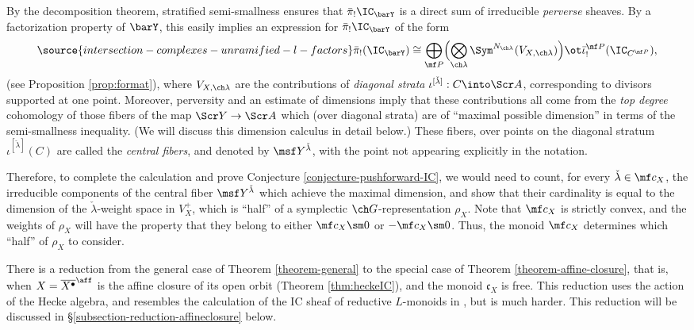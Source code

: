 By the decomposition theorem, stratified semi-smallness ensures that $\bar\pi_! \IC_{\barY}$ is a direct sum of irreducible \emph{perverse} sheaves. By a factorization property of $\barY$, this easily implies an expression for $\bar\pi_! \IC_{\barY}$ of the form
\begin{equation} \label{e:format1-intro}
\source{intersection-complexes-unramified-l-factors}
 \bar\pi_!(\IC_{\barY}) \cong
\bigoplus_{\mf P}
\Bigl( \bigotimes_{\ch\lambda}
\Sym^{N_{\ch\lambda}}(V_{X,\ch\lambda}) \Bigr) \ot
\bar\iota^{\mf P}_!( \IC_{C^{\mf P}} ),
\end{equation}
(see Proposition \ref{prop:format}), where $V_{X,\ch\lambda}$ are the contributions of \emph{diagonal strata} $\iota^{[\check\lambda]}: C \into \Scr A$, corresponding to divisors supported at one point. Moreover, perversity and an estimate of dimensions imply that these contributions all come from the \emph{top degree} cohomology of those fibers of the map $\Scr Y\to \Scr A$ which (over diagonal strata) are of ``maximal possible dimension'' in terms of the semi-smallness  inequality. (We will discuss this dimension calculus in detail below.) These fibers, over points on the diagonal stratum $\iota^{[\check\lambda]}(C)$ are called the \emph{central fibers}, and denoted by $\msf Y^{\check\lambda}$, with the point not appearing explicitly in the notation.





Therefore, to complete the calculation and prove Conjecture \ref{conjecture-pushforward-IC}, we would need to count, for every $\check\lambda \in \mf c_X$, the irreducible components of the central fiber $\msf Y^{\check\lambda}$ which achieve the maximal dimension, and show that their cardinality is equal to the dimension of the $\check\lambda$-weight space in $V_X^+$, which is ``half'' of a symplectic $\ch G$-representation $\rho_X$.
Note that $\mf c_X$ is strictly convex, and the weights of $\rho_X$ will have the property that
they belong to either $\mf c_X\sm 0$ or $-\mf c_X \sm 0$.  Thus, the monoid $\mf c_X$ determines
which ``half'' of $\rho_X$ to consider.



There is a reduction from the general case of Theorem \ref{theorem-general} to the special case of Theorem \ref{theorem-affine-closure}, that is, when $X=\overline{X^\bullet}^\aff$ is the affine closure of its open orbit (Theorem \ref{thm:heckeIC}), and the monoid $\mathfrak c_X$ is free. This reduction uses the action of the Hecke algebra, and resembles the calculation of the IC sheaf of reductive $L$-monoids in \cite{BNS}, but is much harder. This reduction will be discussed in \S \ref{subsection-reduction-affineclosure} below.

